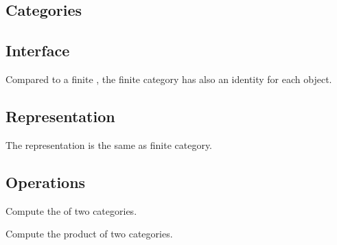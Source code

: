 \subsection{Categories}
\subsection*{Interface}
Compared to a finite , the finite category has also an identity for each object.


\subsection*{Representation}

The representation is the same as finite category.

\subsection*{Operations}

\begin{codeexercise}
    Compute the  of two categories.

\end{codeexercise}

\begin{codeexercise}
    Compute the product of two categories.

\end{codeexercise}

